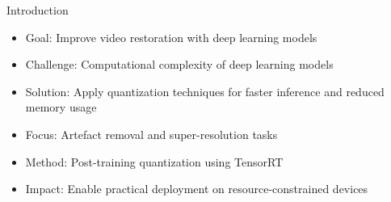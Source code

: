 \documentclass{beamer}
\begin{document}
\begin{frame}{Introduction}
\begin{itemize}
  \item Goal: Improve video restoration with deep learning models
  \item Challenge: Computational complexity of deep learning models
  \item Solution: Apply quantization techniques for faster inference and reduced memory usage
\end{itemize}
\medskip
\begin{itemize}
  \item Focus: Artefact removal and super-resolution tasks
  \item Method: Post-training quantization using TensorRT
  \item Impact: Enable practical deployment on resource-constrained devices
\end{itemize}
\end{frame}
\end{document}
